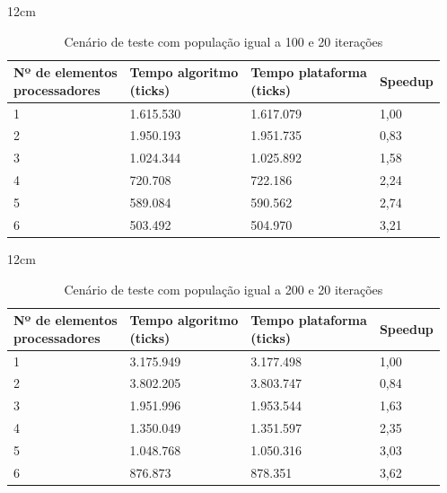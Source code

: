 

\begin{table}[h]{12cm}
    \caption{Cenário de teste com população igual a 100 e 20 iterações}
    \label{cenario1}
    \begin{tabular}{llll}
        \hline
        \shortstack[l]{Nº de elementos \\ processadores} & \shortstack[l]{Tempo algoritmo \\ (ticks)} & \shortstack[l]{Tempo plataforma \\ (ticks)} & Speedup \\
        \hline
        1 & 1.615.530 & 1.617.079 & 1,00 \\
        2 & 1.950.193 & 1.951.735 & 0,83 \\
        3 & 1.024.344 & 1.025.892 &	1,58 \\
        4 & 720.708   & 722.186   & 2,24 \\
        5 & 589.084   & 590.562   & 2,74 \\
        6 & 503.492   & 504.970   & 3,21 \\
        \hline
    \end{tabular}
\end{table}

\begin{table}[h]{12cm}
    \caption{Cenário de teste com população igual a 200 e 20 iterações}
    \label{cenario2}
    \begin{tabular}{llll}
        \hline
        \shortstack[l]{Nº de elementos \\ processadores} & \shortstack[l]{Tempo algoritmo \\ (ticks)} & \shortstack[l]{Tempo plataforma \\ (ticks)} & Speedup \\
        \hline
        1 & 3.175.949 & 3.177.498 & 1,00 \\
        2 & 3.802.205 & 3.803.747 & 0,84 \\
        3 & 1.951.996 & 1.953.544 &	1,63 \\
        4 & 1.350.049 & 1.351.597 & 2,35 \\
        5 & 1.048.768 & 1.050.316 & 3,03 \\
        6 & 876.873   & 878.351   & 3,62 \\
        \hline
    \end{tabular}
\end{table}

